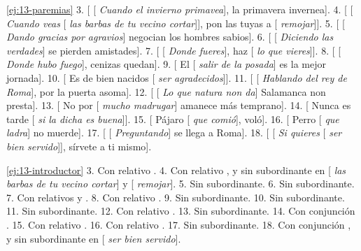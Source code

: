 \lecturasrecomendadas

\solucionario

\begin{solucion}{\ref{ej:13-paremias}}
3. [ [ \textit{Cuando el invierno primavea}], la primavera
invernea]. 4. [ [ \textit{Cuando veas} [ \textit{las
barbas de tu vecino cortar}]], pon las tuyas a [ \textit{remojar}]]. 5.
[ [ \textit{Dando gracias por agravios}] negocian los hombres
sabios]. 6. [ [ \textit{Diciendo las verdades}] se pierden
amistades]. 7. [ [ \textit{Donde fueres}], haz [
\textit{lo que vieres}]]. 8. [ [ \textit{Donde hubo fuego}],
cenizas quedan]. 9. [ El [ \textit{salir de la posada}] es la
mejor jornada]. 10. [ Es de bien nacidos [ \textit{ser
agradecidos}]]. 11. [ [ \textit{Hablando del rey de Roma}], por
la puerta asoma]. 12. [ [ \textit{Lo que natura non da}]
Salamanca non presta]. 13. [ No por [ \textit{mucho
madrugar}] amanece más temprano]. 14. [ Nunca es tarde [
\textit{si la dicha es buena}]]. 15. [ Pájaro [ \textit{que
comió}], voló]. 16. [ Perro [ \textit{que ladra}] no muerde].
17. [ [ \textit{Preguntando}] se llega a Roma]. 18.
[ [ \textit{Si quieres} [ \textit{ser bien
servido}]], sírvete a ti mismo].
\end{solucion}

\begin{solucion}{\ref{ej:13-introductor}}
3. Con relativo . 4. Con relativo , y sin
subordinante en [ \textit{las barbas de tu vecino cortar}] y [
\textit{remojar}]. 5. Sin subordinante. 6. Sin subordinante. 7. Con relativos
 y . 8. Con relativo . 9. Sin
subordinante. 10. Sin subordinante. 11. Sin subordinante. 12. Con relativo
. 13. Sin subordinante. 14. Con conjunción . 15. Con
relativo . 16. Con relativo . 17. Sin subordinante. 18.
Con conjunción , y sin subordinante en [ \textit{ser bien
servido}].
\end{solucion}

